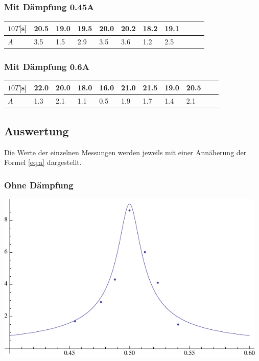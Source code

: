 \documentclass[12pt,a4paper]{article}
\begin{document}
\subsubsection*{Mit D\"ampfung 0.45A}
\begin{tabular}{|l|l|l|l|l|l|l|l|l|l|l|}
\hline
$10T$[s]&20.5&19.0&19.5&20.0&20.2&18.2&19.1\\
\hline
$A$&3.5&1.5&2.9&3.5&3.6&1.2&2.5\\
\hline
\end{tabular}

\subsubsection*{Mit D\"ampfung 0.6A}
\begin{tabular}{|l|l|l|l|l|l|l|l|l|l|l|}
\hline
$10T$[s]&22.0&20.0&18.0&16.0&21.0&21.5&19.0&20.5\\
\hline
$A$&1.3&2.1&1.1&0.5&1.9&1.7&1.4&2.1\\
\hline
\end{tabular}

\subsection*{Auswertung}
Die Werte der einzelnen Messungen werden jeweils mit einer Ann\"aherung der Formel \ref{eq:a} dargestellt.
\subsubsection*{Ohne D\"ampfung}
\includegraphics[width=13cm]{plot23.pdf}
\end{document}
